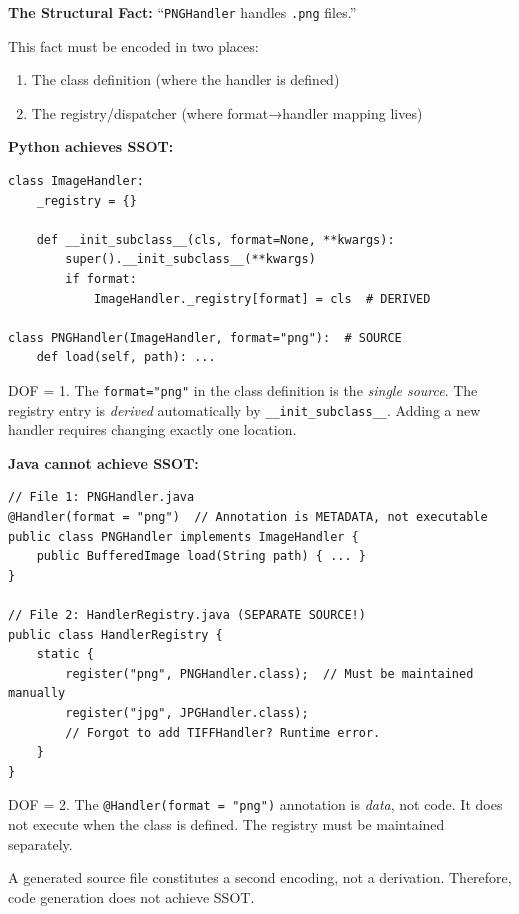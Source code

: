 \textbf{The Structural Fact:} ``\texttt{PNGHandler} handles \texttt{.png} files.''

This fact must be encoded in two places:
\begin{enumerate}
\tightlist
\item The class definition (where the handler is defined)
\item The registry/dispatcher (where format→handler mapping lives)
\end{enumerate}

\textbf{Python achieves SSOT:}

\begin{verbatim}
class ImageHandler:
    _registry = {}

    def __init_subclass__(cls, format=None, **kwargs):
        super().__init_subclass__(**kwargs)
        if format:
            ImageHandler._registry[format] = cls  # DERIVED

class PNGHandler(ImageHandler, format="png"):  # SOURCE
    def load(self, path): ...
\end{verbatim}

DOF = 1. The \texttt{format="png"} in the class definition is the \emph{single source}. The registry entry is \emph{derived} automatically by \texttt{\_\_init\_subclass\_\_}. Adding a new handler requires changing exactly one location.

\textbf{Java cannot achieve SSOT:}

\begin{verbatim}
// File 1: PNGHandler.java
@Handler(format = "png")  // Annotation is METADATA, not executable
public class PNGHandler implements ImageHandler {
    public BufferedImage load(String path) { ... }
}

// File 2: HandlerRegistry.java (SEPARATE SOURCE!)
public class HandlerRegistry {
    static {
        register("png", PNGHandler.class);  // Must be maintained manually
        register("jpg", JPGHandler.class);
        // Forgot to add TIFFHandler? Runtime error.
    }
}
\end{verbatim}

DOF = 2. The \texttt{@Handler(format = "png")} annotation is \emph{data}, not code. It does not execute when the class is defined. The registry must be maintained separately.

\begin{theorem}\label{thm:generated-second}
A generated source file constitutes a second encoding, not a derivation. Therefore, code generation does not achieve SSOT.
\end{theorem}

